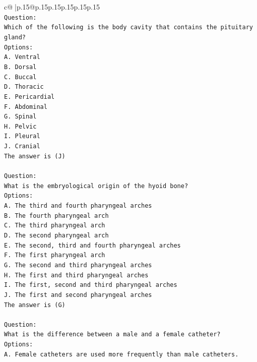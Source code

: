 \documentclass{article}
\begin{document}
{\begin{supertabular}{c@{$\;$}|p{.15\linewidth}@{}p{.15\linewidth}p{.15\linewidth}p{.15\linewidth}p{.15\linewidth}p{.15\linewidth}}
{{{\\ 
\texttt{Question:} \\
\texttt{Which of the following is the body cavity that contains the pituitary gland?} \\
\texttt{Options:} \\
\texttt{A. Ventral} \\
\texttt{B. Dorsal} \\
\texttt{C. Buccal} \\
\texttt{D. Thoracic} \\
\texttt{E. Pericardial} \\
\texttt{F. Abdominal} \\
\texttt{G. Spinal} \\
\texttt{H. Pelvic} \\
\texttt{I. Pleural} \\
\texttt{J. Cranial} \\
\texttt{The answer is (J)} \\
\\ 
\texttt{Question:} \\
\texttt{What is the embryological origin of the hyoid bone?} \\
\texttt{Options:} \\
\texttt{A. The third and fourth pharyngeal arches} \\
\texttt{B. The fourth pharyngeal arch} \\
\texttt{C. The third pharyngeal arch} \\
\texttt{D. The second pharyngeal arch} \\
\texttt{E. The second, third and fourth pharyngeal arches} \\
\texttt{F. The first pharyngeal arch} \\
\texttt{G. The second and third pharyngeal arches} \\
\texttt{H. The first and third pharyngeal arches} \\
\texttt{I. The first, second and third pharyngeal arches} \\
\texttt{J. The first and second pharyngeal arches} \\
\texttt{The answer is (G)} \\
\\ 
\texttt{Question:} \\
\texttt{What is the difference between a male and a female catheter?} \\
\texttt{Options:} \\
\texttt{A. Female catheters are used more frequently than male catheters.} \\
}}}
\end{supertabular}}
\end{document}
